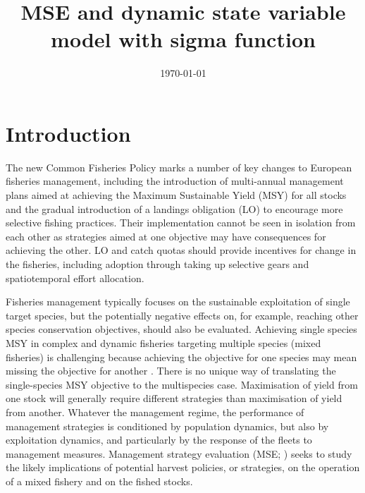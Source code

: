 \documentclass[12pt,oneline,a4paper,numbib]{ouparticle}
\begin{document}
\title{MSE and dynamic state variable model with sigma function}

\author{%
\address{European Commission, Joint Research Centre (JRC), Sustainable Resources Directorate, Water and Marine Resources Unit, Via Enrico Fermi 2749, 21027 Ispra, Italy.}
\and
{}
\address{Wageningen Marine Research, PO Box 68, 1970 AB IJmuiden, The Netherlands.}
}


\date{\today}


\maketitle


\section{Introduction}
\label{sec1}

The new Common Fisheries Policy marks a number of key changes to European fisheries management, including the introduction of multi-annual management plans aimed at achieving the Maximum Sustainable Yield (MSY) for all stocks and the gradual introduction of a landings obligation (LO) to encourage more selective fishing practices. Their implementation cannot be seen in isolation from each other as strategies aimed at one objective may have consequences for achieving the other. LO and catch quotas should provide incentives for change in the fisheries, including adoption through taking up selective gears and spatiotemporal effort allocation.

Fisheries management typically focuses on the sustainable exploitation of single target species, but the potentially negative effects on, for example, reaching other species conservation objectives, should also be evaluated. Achieving single species MSY in complex and dynamic fisheries targeting multiple species (mixed fisheries) is challenging because achieving the objective for one species may mean missing the objective for another \cite{Ulrich2017}. There is no unique way of translating the single-species MSY objective to the multispecies case. Maximisation of yield from one stock will generally require different strategies than maximisation of yield from another.  Whatever the management regime, the performance of management strategies is conditioned by population dynamics, but also by exploitation dynamics, and particularly by the response of the fleets to management measures. Management strategy evaluation (MSE; \cite{Sainsbury2000, Smith1994, Venables2009}) seeks to study the likely implications of potential harvest policies, or strategies, on the operation of a mixed fishery and on the fished stocks. 
\end{document}
